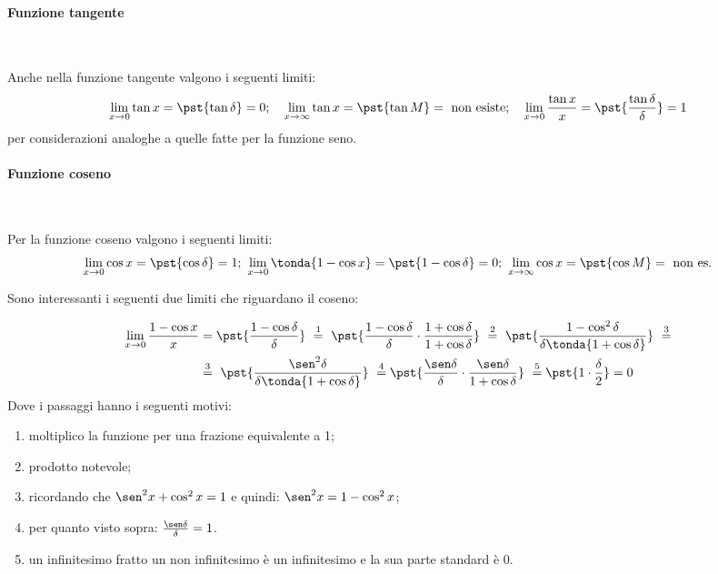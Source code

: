 \paragraph{Funzione tangente}~

Anche nella funzione tangente valgono i seguenti limiti:
\[\lim_{x \rightarrow 0}{\tan x} = \pst{\tan \delta} = 0; \quad
\lim_{x \rightarrow \infty}{\tan x} = \pst{\tan M} = 
                                      \text{ non esiste}; \quad
\lim_{x \rightarrow 0}\frac{\tan x}{x} = \pst{\frac{\tan \delta}{\delta}} 
                                       = 1\]
per considerazioni analoghe a quelle fatte per la funzione seno.

\paragraph{Funzione coseno}~

Per la funzione coseno valgono i seguenti limiti:
\[\lim_{x \rightarrow 0}{\cos x} = \pst{\cos \delta} = 1; ~
\lim_{x \rightarrow 0}\tonda{1-\cos x} = \pst{1-\cos \delta} = 0; ~
\lim_{x \rightarrow \infty}{\cos x} = \pst{\cos M} = \text{ non es.}\]

Sono interessanti i seguenti due limiti che riguardano il coseno:

\begin{align*}
 \lim_{x \rightarrow 0} \frac{1-\cos x}{x} &=
 \pst{\frac{1-\cos \delta}{\delta}}
~ \stackrel{1}{=} ~  
 \pst{\frac{1-\cos \delta}{\delta} \cdot 
      \frac{1+\cos \delta}{1+\cos \delta}}
~ \stackrel{2}{=} ~ 
 \pst{\frac{1-\cos^2 \delta}{\delta \tonda{1+\cos \delta}}}~ 
\stackrel{3}{=} \\
& \stackrel{3}{=} ~
 \pst{\frac{\sen^2 \delta}{\delta \tonda{1+\cos \delta}}}
~ \stackrel{4}{=}
 \pst{\frac{\sen \delta}{\delta} \cdot 
      \frac{\sen \delta}{1+\cos \delta}}
~ \stackrel{5}{=}
 \pst{1 \cdot \frac{\delta}{2}} = 0
\end{align*}
Dove i passaggi hanno i seguenti motivi:
\begin{enumerate} [nosep]
 \item moltiplico la funzione per una frazione equivalente a 1;
 \item prodotto notevole;
 \item ricordando che \(\sen^2 x + \cos^2 x = 1\) e quindi: 
 \(\sen^2 x = 1 - \cos^2 x\);
 \item per quanto visto sopra: \(\frac{\sen \delta}{\delta} = 1\).
 \item un infinitesimo fratto un non infinitesimo è un infinitesimo 
e la sua parte standard è 0.
\end{enumerate}

